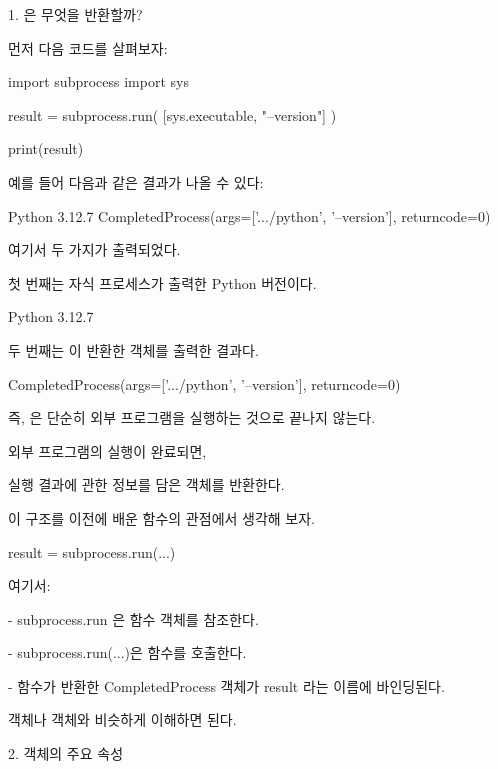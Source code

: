 1. 은 무엇을 반환할까?

먼저 다음 코드를 살펴보자:

\begin{dhkcode}
import subprocess
import sys

result = subprocess.run(
    [sys.executable, "--version"]
)

print(result)
\end{dhkcode}

예를 들어 다음과 같은 결과가 나올 수 있다:

\begin{dhkzsh}
Python 3.12.7
CompletedProcess(args=['.../python', '--version'], returncode=0)
\end{dhkzsh}

여기서 두 가지가 출력되었다.

첫 번째는 자식 프로세스가 출력한 Python 버전이다.

\begin{dhkzsh}
Python 3.12.7
\end{dhkzsh}

두 번째는 이 반환한 객체를 출력한 결과다.

\begin{dhkcode}
CompletedProcess(args=['.../python', '--version'], returncode=0)
\end{dhkcode}

즉, 은 단순히 외부 프로그램을 실행하는 것으로 끝나지 않는다.

외부 프로그램의 실행이 완료되면, 

실행 결과에 관한 정보를 담은  객체를 반환한다.

이 구조를 이전에 배운 함수의 관점에서 생각해 보자.

\begin{dhkcode}
result = subprocess.run(...)
\end{dhkcode}

여기서:

\begin{dhksmry}
    - subprocess.run 은 함수 객체를 참조한다.

    - subprocess.run(...)은 함수를 호출한다.

    - 함수가 반환한 CompletedProcess 객체가 
      result 라는 이름에 바인딩된다.
\end{dhksmry}

 객체나  객체와 비슷하게 이해하면 된다.

2.  객체의 주요 속성

